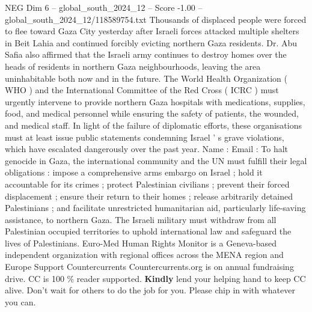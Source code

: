\begin{textsample}{NEG Dim 6 – global\_south\_2024\_12 – Score -1.00 – global\_south\_2024\_12/118589754.txt}
Thousands of displaced people were forced to flee toward Gaza City yesterday after Israeli forces attacked multiple shelters in Beit Lahia and continued forcibly evicting northern Gaza residents.
Dr.
Abu Safia also affirmed that the Israeli army continues to destroy homes over the heads of residents in northern Gaza neighbourhoods, leaving the area uninhabitable both now and in the future.
The World Health Organization ( WHO ) and the International Committee of the Red Cross ( ICRC ) must urgently intervene to provide northern Gaza hospitals with medications, supplies, food, and medical personnel while ensuring the safety of patients, the wounded, and medical staff.
In light of the failure of diplomatic efforts, these organisations must at least issue public statements condemning Israel ' s grave violations, which have escalated dangerously over the past year.
Name : Email : To halt genocide in Gaza, the international community and the UN must fulfill their legal obligations : impose a comprehensive arms embargo on Israel ; hold it accountable for its crimes ; protect Palestinian civilians ; prevent their forced displacement ; ensure their return to their homes ; release arbitrarily detained Palestinians ; and facilitate unrestricted humanitarian aid, particularly life-saving assistance, to northern Gaza.
The Israeli military must withdraw from all Palestinian occupied territories to uphold international law and safeguard the lives of Palestinians.
Euro-Med Human Rights Monitor is a Geneva-based independent organization with regional offices across the MENA region and Europe Support Countercurrents Countercurrents.org is on annual fundraising drive.
CC is 100 \% reader supported. \textbf{Kindly} lend your helping hand to keep CC alive.
Don't wait for others to do the job for you.
Please chip in with whatever you can.

\end{textsample}
